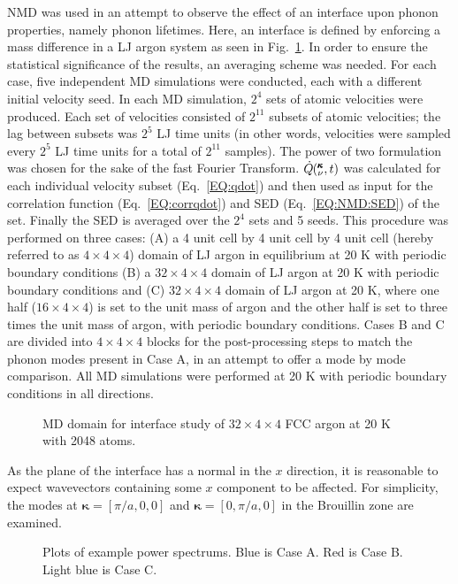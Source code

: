 NMD was used in an attempt to observe the effect of an interface upon phonon properties, namely phonon lifetimes. Here, an interface is defined by enforcing a mass difference in a LJ argon system as seen in Fig.~\ref{fig:interface_domain}. In order to ensure the statistical significance of the results, an averaging scheme was needed. For each case, five independent MD simulations were conducted, each with a different initial velocity seed. In each MD simulation, $2^4$ sets of atomic velocities were produced. Each set of velocities consisted of $2^{11}$ subsets of atomic velocities; the lag between subsets was $2^5$ LJ time units (in other words, velocities were sampled every $2^5$ LJ time units for a total of $2^{11}$ samples). The power of two formulation was chosen for the sake of the fast Fourier Transform. $\dot{Q}\mspace{-4.0mu}\left(\mspace{-8.0mu} \begin{smallmatrix}&\pmb{\kappa} \\&\nu\end{smallmatrix} \mspace{-2.0mu},t\right)$ was calculated for each individual velocity subset (Eq.~\ref{EQ:qdot}) and then used as input for the correlation function (Eq.~\ref{EQ:corrqdot}) and SED (Eq.~\ref{EQ:NMD:SED}) of the set. Finally the SED is averaged over the $2^4$ sets and 5 seeds. This procedure was performed on three cases: (A) a 4 unit cell by 4 unit cell by 4 unit cell (hereby referred to as $4\times4\times4$) domain of LJ argon in equilibrium at 20 K with periodic boundary conditions (B) a $32\times4\times4$ domain of LJ argon at 20 K with periodic boundary conditions and (C) $32\times4\times4$ domain of LJ argon at 20 K, where one half ($16\times4\times4$) is set to the unit mass of argon and the other half is set to three times the unit mass of argon, with periodic boundary conditions. Cases B and C are divided into $4\times4\times4$ blocks for the post-processing steps to match the phonon modes present in Case A, in an attempt to offer a mode by mode comparison. All MD simulations were performed at 20 K with periodic boundary conditions in all directions.
\begin{figure}%
\begin{center}
\renewcommand{\figure}{Fig.}
\caption{MD domain for interface study of $32\times4\times4$ FCC argon at 20 K with 2048 atoms.}
\label{fig:interface_domain}
\end{center}
\end{figure}
As the plane of the interface has a normal in the $x$ direction, it is reasonable to expect wavevectors containing some $x$ component to be affected. For simplicity, the modes at $\bm{\kappa}=[\pi/a,0,0]$ and $\bm{\kappa}=[0,\pi/a,0]$ in the Brouillin zone are examined. 
\renewcommand{\topfraction}{1.0}
\begin{figure*}%
\begin{center}
\renewcommand{\figure}{Fig.}
\caption{Plots of example power spectrums. Blue is Case A. Red is Case B. Light blue is Case C.}
\label{fig:sed}
\end{center}
\end{figure*}

